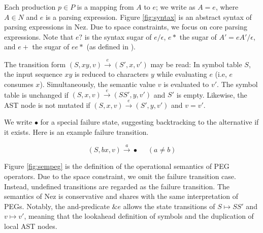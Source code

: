 \documentclass[preprint]{sigplanconf}
\begin{document}
Each production $p \in P$ is a mapping from $A$ to $e$; we write as $A=e$, where $A \in N$ and $e$ is a parsing expression. Figure \ref{fig:syntax} is an abstract syntax of parsing expressions in Nez. Due to space constraints, we focus on core parsing expressions. Note that  $e?$ is the syntax sugar of $e / \epsilon$, $e*$ the sugar of $A' = e A' / \epsilon$, and $e+$ the sugar of $e e*$ (as defined in \cite{POPL04_PEG}).



The transition form $(S, xy, v) \xrightarrow{e} (S', x, v')$ may be read: In symbol table $S$, the input sequence $xy$ is reduced to characters $y$ while evaluating $e$ (i.e, $e$ consumes $x$). Simultaneously, the semantic value $v$ is evaluated to $v'$.  The symbol table is unchanged if $(S, x, v) \xrightarrow{e} (S S', y, v')$ and $S'$ is empty. Likewise, the AST node is not mutated if  $(S, x, v) \xrightarrow{e} (S', y, v')$ and $v = v'$. 

We write $\bullet$ for a special failure state, suggesting backtracking to the alternative if it exists. Here is an example failure transition. 

\[
     (S, bx, v)  \xrightarrow{a} \bullet    ~~~~~~ (a \ne b)
\]

Figure \ref{fig:sempeg} is the definition of the operational semantics of PEG operators. Due to the space constraint, we omit the failure transition case. Instead, undefined transitions are regarded as the failure transition. The semantics of Nez is conservative and shares with the same interpretation of PEGs. Notably, the and-predicate $\& e$ allows the state transitions of $S \mapsto S S'$ and $v \mapsto v'$, meaning that the lookahead definition of symbols and the duplication of local AST nodes.
\end{document}
